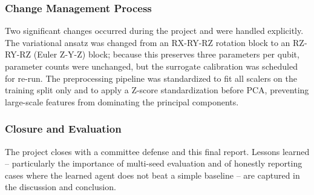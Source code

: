 \subsubsection{Change Management Process}
Two significant changes occurred during the project and were handled explicitly. The variational ansatz was changed from an RX-RY-RZ rotation block to an RZ-RY-RZ (Euler Z-Y-Z) block; because this preserves three parameters per qubit, parameter counts were unchanged, but the surrogate calibration was scheduled for re-run. The preprocessing pipeline was standardized to fit all scalers on the training split only and to apply a Z-score standardization before PCA, preventing large-scale features from dominating the principal components.

\subsubsection{Closure and Evaluation}
The project closes with a committee defense and this final report. Lessons learned -- particularly the importance of multi-seed evaluation and of honestly reporting cases where the learned agent does not beat a simple baseline -- are captured in the discussion and conclusion.


